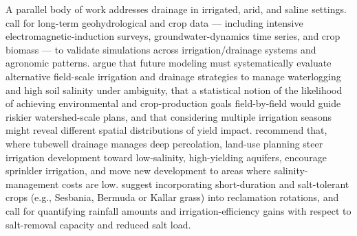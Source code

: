 A parallel body of work addresses drainage in irrigated, arid, and saline settings. \textcite{Yao2017} call for long-term geohydrological and crop data --- including intensive electromagnetic-induction surveys, groundwater-dynamics time series, and crop biomass --- to validate simulations across irrigation/drainage systems and agronomic patterns. \textcite{Alzraiee2013} argue that future modeling must systematically evaluate alternative field-scale irrigation and drainage strategies to manage waterlogging and high soil salinity under ambiguity, that a statistical notion of the likelihood of achieving environmental and crop-production goals field-by-field would guide riskier watershed-scale plans, and that considering multiple irrigation seasons might reveal different spatial distributions of yield impact. \textcite{Bethune2008} recommend that, where tubewell drainage manages deep percolation, land-use planning steer irrigation development toward low-salinity, high-yielding aquifers, encourage sprinkler irrigation, and move new development to areas where salinity-management costs are low. \textcite{Qadir2001} suggest incorporating short-duration and salt-tolerant crops (e.g., Sesbania, Bermuda or Kallar grass) into reclamation rotations, and \textcite{Castanheira2010} call for quantifying rainfall amounts and irrigation-efficiency gains with respect to salt-removal capacity and reduced salt load.

